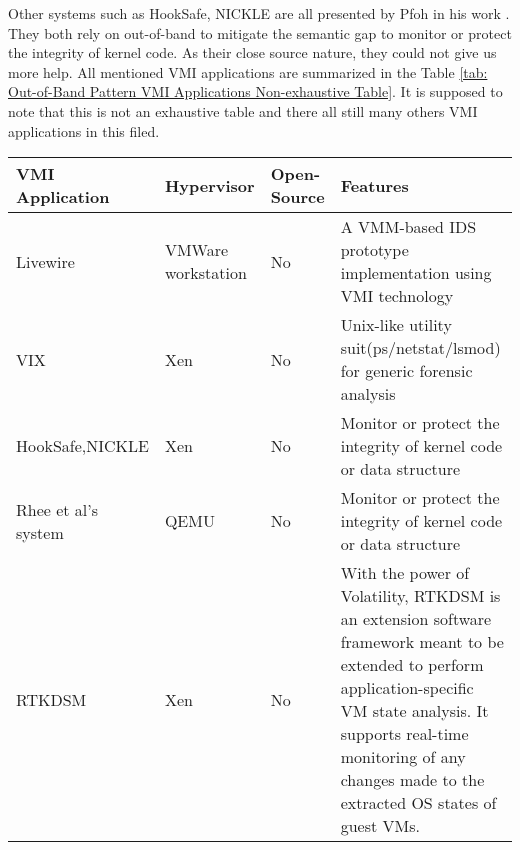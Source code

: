 Other systems such as HookSafe, NICKLE are all presented by Pfoh in his work  \cite{Reference7}. They both rely on out-of-band to mitigate the 
semantic gap to monitor or protect the integrity of kernel code. As their close source nature, they could not give us more help. All mentioned 
VMI applications are summarized in the Table \ref{tab: Out-of-Band Pattern VMI Applications Non-exhaustive Table}. It is supposed to 
note that this is not an exhaustive table and there all still many others VMI applications in this filed.


\begin{table*}[!hbp]
      \centering	%
      \caption{Out-of-Band Pattern VMI Applications Non-exhaustive Table}
      \label{tab: Out-of-Band Pattern VMI Applications Non-exhaustive Table}      
      \begin{tabular}{| p{3cm} |p{2cm} | p{2cm} |p{6cm}|}
      \hline
      VMI Application & Hypervisor & Open-Source & Features \\ 
      \hline
      Livewire \cite{Reference1} & VMWare workstation & No & A VMM-based IDS prototype implementation using VMI technology \\ 
      \hline
      VIX \cite{Reference10} & Xen & No  & Unix-like utility suit(ps/netstat/lsmod) for generic forensic analysis \\
      \hline
      HookSafe,NICKLE \cite{Reference38} & Xen & No & Monitor or protect the integrity of kernel code or data structure\\
      \hline
      Rhee et al's system \cite{Reference39} & QEMU & No & Monitor or protect the integrity of kernel code or data structure\\
      \hline
      RTKDSM \cite{Reference3} & Xen & No & With the power of Volatility, RTKDSM is an extension software framework
      meant to be extended to perform application-specific VM state analysis. It supports real-time monitoring of any changes made
      to the extracted OS states of guest VMs.\\
      \hline
      \end{tabular}
\end{table*}

